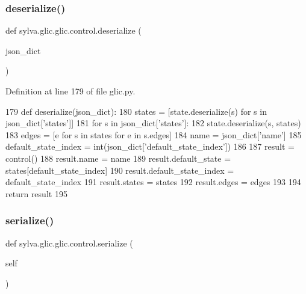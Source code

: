 \subsubsection{\texorpdfstring{deserialize()}{deserialize()}}
{\footnotesize\ttfamily def sylva.\+glic.\+glic.\+control.\+deserialize (\begin{DoxyParamCaption}\item[{}]{json\+\_\+dict }\end{DoxyParamCaption})\hspace{0.3cm}{\ttfamily [static]}}



Definition at line 179 of file glic.\+py.


\begin{DoxyCode}
179     \textcolor{keyword}{def }deserialize(json\_dict):
180       states = [state.deserialize(s) \textcolor{keywordflow}{for} s \textcolor{keywordflow}{in} json\_dict[\textcolor{stringliteral}{'states'}]]
181       \textcolor{keywordflow}{for} s \textcolor{keywordflow}{in} json\_dict[\textcolor{stringliteral}{'states'}]:
182         state.deserialize(s, states)
183       edges = [e \textcolor{keywordflow}{for} s \textcolor{keywordflow}{in} states \textcolor{keywordflow}{for} e \textcolor{keywordflow}{in} s.edges]
184       name = json\_dict[\textcolor{stringliteral}{'name'}]
185       default\_state\_index = int(json\_dict[\textcolor{stringliteral}{'default\_state\_index'}])
186 
187       result = control()
188       result.name = name
189       result.default\_state = states[default\_state\_index]
190       result.default\_state\_index = default\_state\_index
191       result.states = states
192       result.edges = edges
193 
194       \textcolor{keywordflow}{return} result
195 
\end{DoxyCode}
\mbox{\label{classsylva_1_1glic_1_1glic_1_1control_a5d7147d7ce52b8f9e3e96f3dfcba672f}} 
\subsubsection{\texorpdfstring{serialize()}{serialize()}}
{\footnotesize\ttfamily def sylva.\+glic.\+glic.\+control.\+serialize (\begin{DoxyParamCaption}\item[{}]{self }\end{DoxyParamCaption})}



